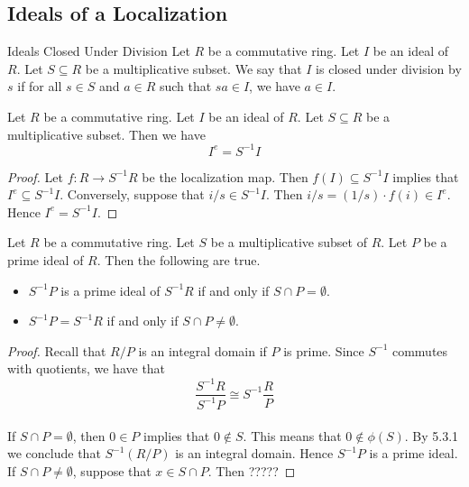 \documentclass[a4paper]{article}
\begin{document}
\subsection{Ideals of a Localization}
\begin{defn}{Ideals Closed Under Division}{} Let $R$ be a commutative ring. Let $I$ be an ideal of $R$. Let $S\subseteq R$ be a multiplicative subset. We say that $I$ is closed under division by $s$ if for all $s\in S$ and $a\in R$ such that $sa\in I$, we have $a\in I$. 
\end{defn}

\begin{lmm}{}{} Let $R$ be a commutative ring. Let $I$ be an ideal of $R$. Let $S\subseteq R$ be a multiplicative subset. Then we have $$I^e=S^{-1}I$$ 
\begin{proof}
Let $f:R\to S^{-1}R$ be the localization map. Then $f(I)\subseteq S^{-1}I$ implies that $I^e\subseteq S^{-1}I$. Conversely, suppose that $i/s\in S^{-1}I$. Then $i/s=(1/s)\cdot f(i)\in I^e$. Hence $I^e=S^{-1}I$. 
\end{proof}
\end{lmm}

\begin{prp}{}{} Let $R$ be a commutative ring. Let $S$ be a multiplicative subset of $R$. Let $P$ be a prime ideal of $R$. Then the following are true. 
\begin{itemize}
\item $S^{-1}P$ is a prime ideal of $S^{-1}R$ if and only if $S\cap P=\emptyset$. 
\item $S^{-1}P=S^{-1}R$ if and only if $S\cap P\neq\emptyset$. 
\end{itemize} 
\begin{proof}
Recall that $R/P$ is an integral domain if $P$ is prime. Since $S^{-1}$ commutes with quotients, we have that $$\frac{S^{-1}R}{S^{-1}P}\cong S^{-1}\frac{R}{P}$$\\

If $S\cap P=\emptyset$, then $0\in P$ implies that $0\notin S$. This means that $0\notin\phi(S)$. By 5.3.1 we conclude that $S^{-1}(R/P)$ is an integral domain. Hence $S^{-1}P$ is a prime ideal. If $S\cap P\neq\emptyset$, suppose that $x\in S\cap P$. Then ?????
\end{proof}
\end{prp}
\end{document}
